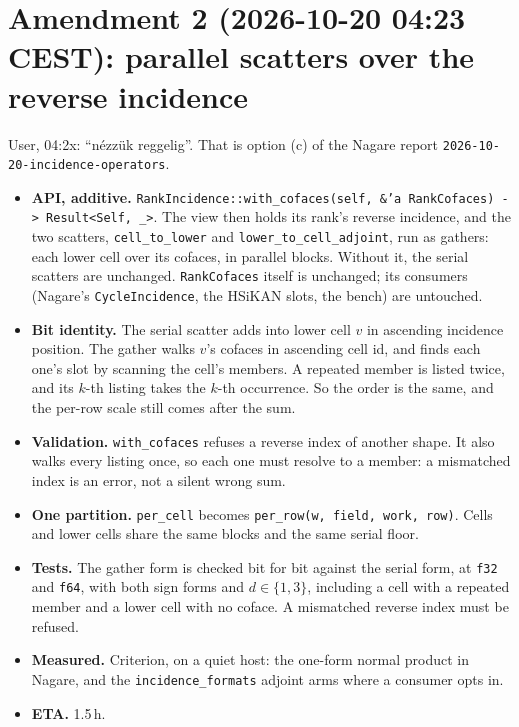 \documentclass[11pt,a4paper]{article}
\begin{document}
\section{Amendment 2 (2026-10-20 04:23 CEST): parallel scatters over the reverse incidence}
User, 04:2x: ``n\'ezz\"uk reggelig''. That is option (c) of the Nagare report \texttt{2026-10-20-incidence-operators}.
\begin{itemize}
\item \textbf{API, additive.} \texttt{RankIncidence::with\_cofaces(self, \&'a RankCofaces) -> Result<Self, \_>}. The
  view then holds its rank's reverse incidence, and the two scatters, \texttt{cell\_to\_lower} and
  \texttt{lower\_to\_cell\_adjoint}, run as gathers: each lower cell over its cofaces, in parallel blocks. Without it,
  the serial scatters are unchanged. \texttt{RankCofaces} itself is unchanged; its consumers (Nagare's
  \texttt{CycleIncidence}, the HSiKAN slots, the bench) are untouched.
\item \textbf{Bit identity.} The serial scatter adds into lower cell $v$ in ascending incidence position. The gather
  walks $v$'s cofaces in ascending cell id, and finds each one's slot by scanning the cell's members. A repeated member
  is listed twice, and its $k$-th listing takes the $k$-th occurrence. So the order is the same, and the per-row
  scale still comes after the sum.
\item \textbf{Validation.} \texttt{with\_cofaces} refuses a reverse index of another shape. It also walks every
  listing once, so each one must resolve to a member: a mismatched index is an error, not a silent wrong sum.
\item \textbf{One partition.} \texttt{per\_cell} becomes \texttt{per\_row(w, field, work, row)}. Cells and lower
  cells share the same blocks and the same serial floor.
\item \textbf{Tests.} The gather form is checked bit for bit against the serial form, at \texttt{f32} and
  \texttt{f64}, with both sign forms and $d\in\{1,3\}$, including a cell with a repeated member and a lower cell
  with no coface. A mismatched reverse index must be refused.
\item \textbf{Measured.} Criterion, on a quiet host: the one-form normal product in Nagare, and the
  \texttt{incidence\_formats} adjoint arms where a consumer opts in.
\item \textbf{ETA.} 1.5\,h.
\end{itemize}
\end{document}
